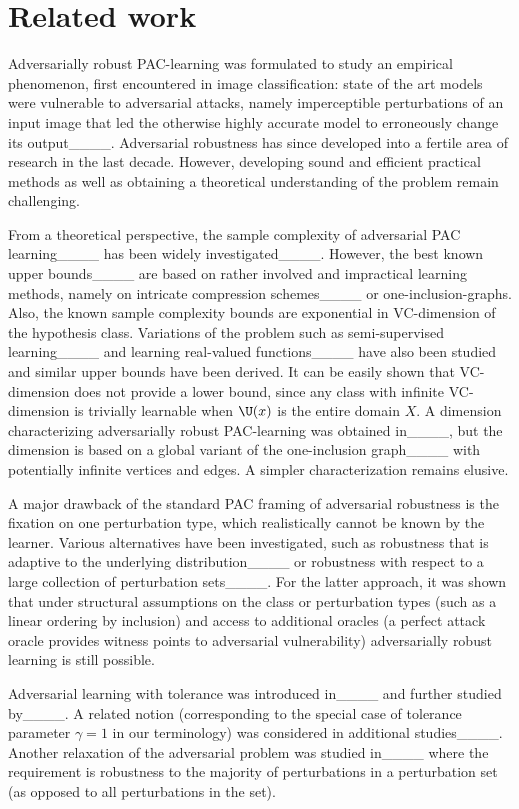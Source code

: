 \section{Related work}
Adversarially robust PAC-learning was formulated to study an empirical phenomenon, first encountered in image classification: state of the art models were vulnerable to adversarial attacks, namely imperceptible perturbations of an input image that led the otherwise highly accurate model to erroneously change its output____. Adversarial robustness has since developed into a fertile area of research in the last decade. 
However, developing sound and efficient practical methods as well as obtaining a theoretical understanding of the problem remain challenging.

From a theoretical perspective, the sample complexity of adversarial PAC learning____ has been widely investigated____. However, the best known upper bounds____ are based on rather involved and impractical learning methods, namely on intricate compression schemes____ or one-inclusion-graphs.
Also, the known sample complexity bounds are exponential in VC-dimension of the hypothesis class. 
Variations of the problem such as semi-supervised learning____ and learning real-valued functions____ have also been studied and similar upper bounds have been derived. It can be easily shown that VC-dimension does not provide a lower bound, since any class with infinite VC-dimension is trivially learnable when
$\U(x)$ is the entire domain $X$. A dimension characterizing adversarially robust PAC-learning was obtained in____, but the dimension is based on a global variant of the one-inclusion graph____ 
with potentially infinite vertices and edges. A simpler characterization remains elusive.

A major drawback of the standard PAC framing of adversarial robustness is the fixation on one perturbation type, which realistically cannot be known by the learner. Various alternatives have been investigated, such as robustness that is adaptive to the underlying distribution____ or robustness with respect to a large collection of perturbation sets____. For the latter approach, it was shown that under structural assumptions on the class or perturbation types (such as a linear ordering by inclusion) and access to additional oracles (a perfect attack oracle provides witness points to adversarial vulnerability) adversarially robust learning is still possible.


Adversarial learning with tolerance was introduced in____ and further studied by____. A related notion (corresponding to the special case of tolerance parameter $\gamma = 1$ in our terminology) was considered in additional studies____. Another relaxation of the adversarial problem was studied in____ where the requirement is robustness to the majority of perturbations in a perturbation set (as opposed to all perturbations in the set).